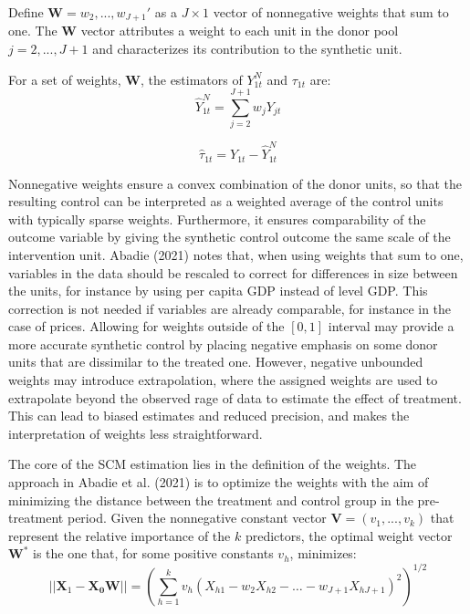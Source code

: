 \documentclass[12pt,a4paper,draft]{article}
\begin{document}
Define $\mathbf{W}=w_2,...,w_{J+1}'$ as a $J\times 1$ vector of nonnegative weights
that sum to one. 
The $\mathbf{W}$ vector attributes a weight to each unit in the donor pool 
$j=2,...,J+1$ and characterizes its contribution to the synthetic unit. 

For a set of weights, $\mathbf{W}$, the estimators of $Y_{1t}^N$ and $\tau_{1t}$ are:
\begin{equation}
    \hat{Y}_{1t}^N = \sum_{j=2}^{J+1} {w_jY_{jt}}
\end{equation}

\begin{equation}
    \hat{\tau}_{1t}=Y_{1t}- \hat{Y}_{1t}^N
\end{equation}


Nonnegative weights ensure a convex combination of the donor 
units, so that the resulting control can be interpreted as a weighted average 
of the control units with typically sparse weights. 
Furthermore, it ensures comparability of the outcome variable by giving the 
synthetic control outcome the same scale of the intervention unit. 
Abadie (2021) notes that, when using weights that sum to one, variables in the data 
should be rescaled to correct for differences in size between the units, for 
instance by using per capita GDP instead of level GDP. This correction is not 
needed if variables are already comparable, for instance in the case of prices.
Allowing for weights outside of the $[0,1]$ interval may provide a more 
accurate synthetic control by placing negative emphasis on some donor units that 
are dissimilar to the treated one. However, negative unbounded weights may 
introduce extrapolation, where the assigned weights are used to extrapolate 
beyond the observed rage of data to estimate the effect of treatment. 
This can lead to biased estimates and reduced precision, and makes the interpretation 
of weights less straightforward. 

The core of the SCM estimation lies in the definition of the weights. 
The approach in Abadie et al. (2021) is to optimize the weights with the aim of 
minimizing the distance between the treatment and control group in the 
pre-treatment period. Given the nonnegative constant vector $\mathbf{V}=(v_1,...,v_k)$ 
that represent the relative importance of the $k$ predictors, the optimal 
weight vector $\mathbf{W}^*$ is the one that, for some positive constants $v_h$, minimizes:
\begin{equation}
    || \mathbf{X}_1 - \mathbf{X_0} \mathbf{W} || = 
\left( \sum_{h=1}^k {v_h \left( X_{h1}-w_2 X_{h2}-\ldots - w_{J+1} 
X_{hJ+1} \right) ^2} \right)^{1/2}
\end{equation}
\end{document}
